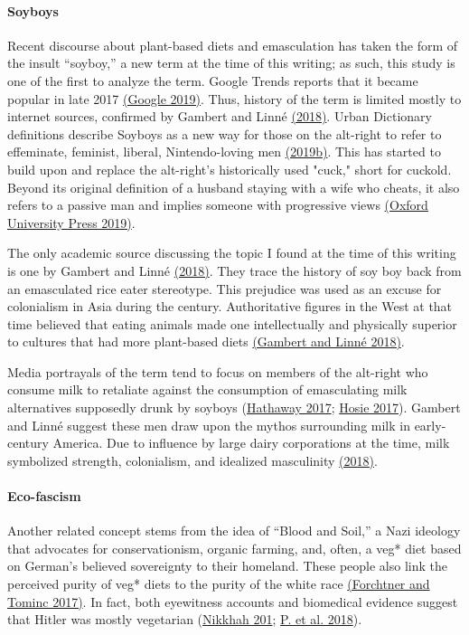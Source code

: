 \documentclass[twoside]{report}
\begin{document}
\begin{multicols*}{2}
\paragraph{Soyboys}

Recent discourse about plant-based diets and emasculation has taken the
form of the insult ``soyboy,'' a new term at the time of this
writing; as such, this study is one of the first to analyze the term.
Google Trends reports that it became popular in late 2017 \hyperlink{google}{(Google 2019)}. Thus, history of the term is limited mostly to internet sources, confirmed by Gambert and Linné \hyperlink{gambert}{(2018)}. Urban Dictionary definitions describe Soyboys as a new way for those on the alt-right to refer to effeminate, feminist, liberal, Nintendo-loving men \hyperlink{2019b}{(2019b)}. This has
started to build upon and replace the alt-right's historically used
"cuck," short for cuckold. Beyond its original definition of a husband staying with a wife who cheats, it also refers to a passive man and implies someone
with progressive views \hyperlink{oxford}{(Oxford University Press 2019)}.

The only academic source discussing the topic I found at the time of
this writing is one by Gambert and Linné \hyperlink{gambert}{(2018)}. They trace the history of soy boy back from an emasculated rice eater stereotype. This prejudice was used as an excuse for colonialism in Asia during the  century. Authoritative figures in the West at that time believed that
eating animals made one intellectually and physically superior to
cultures that had more plant-based diets \hyperlink{gambert}{(Gambert and Linné 2018)}.

Media portrayals of the term tend to focus on members of the alt-right
who consume milk to retaliate against the consumption of emasculating
milk alternatives supposedly drunk by soyboys (\hyperlink{hathaway}{Hathaway 2017}; \hyperlink{hosie}{Hosie 2017}). Gambert and Linné suggest these men draw upon the mythos surrounding milk in early- century America. Due to influence by large dairy corporations at the time, milk symbolized strength, colonialism, and idealized masculinity \hyperlink{gambert}{(2018)}.

\paragraph{Eco-fascism}

Another related concept stems from the idea of ``Blood
and Soil,'' a Nazi ideology that advocates for conservationism,
organic farming, and, often, a veg* diet based on German's believed
sovereignty to their homeland. These people also
link the perceived purity of veg* diets to the purity of the white race
\hyperlink{forchtner}{(Forchtner and Tominc 2017)}. In fact, both eyewitness accounts and biomedical evidence suggest that Hitler was mostly vegetarian (\hyperlink{nikkhah}{Nikkhah 201}; \hyperlink{p}{P. et al. 2018}).


\end{multicols*}
\end{document}
